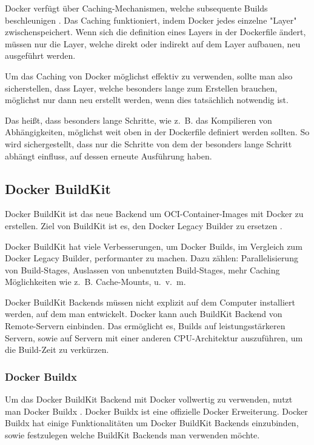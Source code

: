 Docker verfügt über Caching-Mechanismen, welche subsequente Builds beschleunigen \cite{dockerCache}. Das Caching funktioniert, indem Docker jedes einzelne "Layer" zwischenspeichert. Wenn sich die definition eines Layers in der Dockerfile ändert, müssen nur die Layer, welche direkt oder indirekt auf dem Layer aufbauen, neu ausgeführt werden. 

Um das Caching von Docker möglichst effektiv zu verwenden, sollte man also sicherstellen, dass Layer, welche besonders lange zum Erstellen brauchen, möglichst nur dann neu erstellt werden, wenn dies tatsächlich notwendig ist.

Das heißt, dass besonders lange Schritte, wie z. B. das Kompilieren von Abhängigkeiten, möglichst weit oben in der Dockerfile definiert werden sollten. So wird sichergestellt, dass nur die Schritte von dem der besonders lange Schritt abhängt einfluss, auf dessen erneute Ausführung haben.

\subsection{Docker BuildKit}

Docker BuildKit ist das neue Backend um OCI-Container-Images mit Docker zu erstellen. Ziel von BuildKit ist es, den Docker Legacy Builder zu ersetzen \cite{dockerBuildKit}.

Docker BuildKit hat viele Verbesserungen, um Docker Builds, im Vergleich zum Docker Legacy Builder, performanter zu machen. Dazu zählen: Parallelisierung von Build-Stages, Auslassen von unbenutzten Build-Stages, mehr Caching Möglichkeiten wie z. B. Cache-Mounts, u. v. m.

Docker BuildKit Backends müssen nicht explizit auf dem Computer installiert werden, auf dem man entwickelt. Docker kann auch BuildKit Backend von Remote-Servern einbinden. Das ermöglicht es, Builds auf leistungsstärkeren Servern, sowie auf Servern mit einer anderen CPU-Architektur auszuführen, um die Build-Zeit zu verkürzen.

\subsubsection{Docker Buildx}

Um das Docker BuildKit Backend mit Docker vollwertig zu verwenden, nutzt man Docker Buildx \cite{dockerDockerBuildx}. Docker Buildx ist eine offizielle Docker Erweiterung. Docker Buildx hat einige Funktionalitäten um Docker BuildKit Backends einzubinden, sowie festzulegen welche BuildKit Backends man verwenden möchte.

